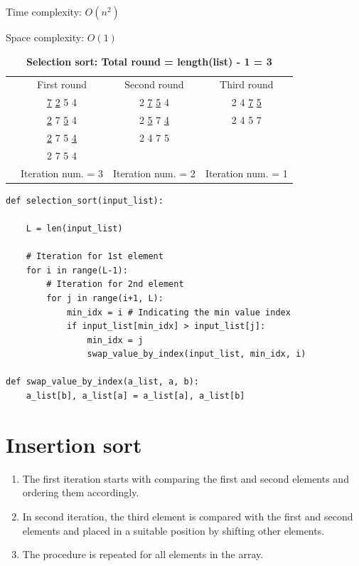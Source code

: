 \documentclass[a4paper,11pt]{book}
\begin{document}
\noindent Time complexity: $O(n^2)$

\noindent Space complexity: $O(1)$

\begin{table}[h]
	\label{Selection sort}
	\caption{\textbf{Selection sort: Total round = length(list) - 1 = 3}}
	\vspace{2mm}
	\centering
	\begin{tabular}{cccc}
		&{First round}  &{Second round}  &{Third round}   \\
		&\underline{7} \underline{2} 5 4  &2 \underline{7} \underline{5} 4 &2 4 \underline{7} \underline{5}   \\
		&\underline{2} 7 \underline{5} 4 &2 \underline{5} 7 \underline{4}  &2 4 5 7   \\
		&\underline{2} 7 5 \underline{4}  &2 4 7 5 &   \\
		&2 7 5 4  & &\\
		&Iteration num. = 3 &Iteration num. = 2 &Iteration num. = 1 
	\end{tabular}
\end{table}

\begin{lstlisting}
def selection_sort(input_list):

    L = len(input_list)
    
    # Iteration for 1st element
    for i in range(L-1): 
        # Iteration for 2nd element
        for j in range(i+1, L): 
            min_idx = i # Indicating the min value index
            if input_list[min_idx] > input_list[j]:
                min_idx = j
                swap_value_by_index(input_list, min_idx, i)
                
def swap_value_by_index(a_list, a, b):
    a_list[b], a_list[a] = a_list[a], a_list[b]
\end{lstlisting}

\newpage
\section{Insertion sort}

\begin{enumerate}
	\item The first iteration starts with comparing the first and second elements and ordering them accordingly.
	\item In second iteration, the third element is compared with the first and second elements and placed in a suitable position by shifting other elements.
	\item The procedure is repeated for all elements in the array.
\end{enumerate}
\end{document}
